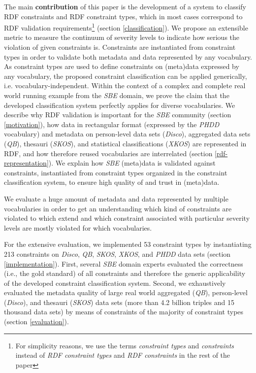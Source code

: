 \documentclass{llncs}
\begin{document}
The main \textbf{contribution} of this paper is the development of a system to classify RDF constraints and RDF constraint types, which in most cases correspond to RDF validation requirements\footnote{For simplicity reasons, we use the terms \emph{constraint types} and \emph{constraints} instead of \emph{RDF constraint types} and \emph{RDF constraints} in the rest of the paper} (section \ref{classification}).
We propose an extensible metric to measure the continuum of severity levels to indicate how serious the violation of given constraints is.
Constraints are instantiated from constraint types in order to validate both metadata and data represented by any vocabulary. 
As constraint types are used to define constraints on (meta)data expressed by any vocabulary, the proposed constraint classification can be applied generically, i.e. vocabulary-independent. 
Within the context of a complex and complete real world running example from the \emph{SBE} domain, we prove the claim that the developed classification system perfectly applies for diverse vocabularies.
We describe why RDF validation is important for the \emph{SBE} community (section \ref{motivation}), 
how data in rectangular format (expressed by the \emph{PHDD} vocabulary) and metadata on person-level data sets (\emph{Disco}), aggregated data sets (\emph{QB}), thesauri (\emph{SKOS}), and statistical classifications (\emph{XKOS}) are represented in RDF, and how therefore reused vocabularies are interrelated (section \ref{rdf-representation}).
We explain how \emph{SBE} (meta)data is validated against constraints, instantiated from constraint types organized in the constraint classification system, to ensure high quality of and trust in (meta)data.

We evaluate a huge amount of metadata and data represented by multiple vocabularies in order to get an understanding which kind of constraints are violated to which extend and which constraint associated with particular severity levels are mostly violated for which vocabularies.

For the extensive evaluation, we implemented 53 constraint types by instantiating 213 constraints on \emph{Disco}, \emph{QB}, \emph{SKOS}, \emph{XKOS}, and \emph{PHDD} data sets (section \ref{implementation}).
First, several \emph{SBE} domain experts evaluated the correctness (i.e., the gold standard) of all constraints and therefore the generic applicability of the developed constraint classification system. 
Second, we exhaustively evaluated the metadata quality of large real world aggregated (\emph{QB}), person-level (\emph{Disco}), and thesauri (\emph{SKOS}) data sets (more than 4.2 billion triples and 15 thousand data sets) by means of constraints of the majority of constraint types (section \ref{evaluation}).
\end{document}
